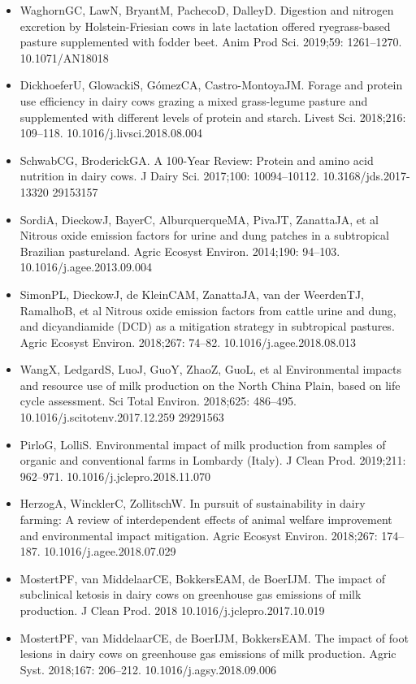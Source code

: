 \documentclass[11pt,a4paper]{article}
\begin{document}
\begin{itemize}
\item WaghornGC, LawN, BryantM, PachecoD, DalleyD. Digestion and nitrogen excretion by Holstein-Friesian cows in late lactation offered ryegrass-based pasture supplemented with fodder beet. Anim Prod Sci. 2019;59: 1261–1270. 10.1071/AN18018
\item DickhoeferU, GlowackiS, GómezCA, Castro-MontoyaJM. Forage and protein use efficiency in dairy cows grazing a mixed grass-legume pasture and supplemented with different levels of protein and starch. Livest Sci. 2018;216: 109–118. 10.1016/j.livsci.2018.08.004
\item SchwabCG, BroderickGA. A 100-Year Review: Protein and amino acid nutrition in dairy cows. J Dairy Sci. 2017;100: 10094–10112. 10.3168/jds.2017-13320 29153157
\item SordiA, DieckowJ, BayerC, AlburquerqueMA, PivaJT, ZanattaJA, et al Nitrous oxide emission factors for urine and dung patches in a subtropical Brazilian pastureland. Agric Ecosyst Environ. 2014;190: 94–103. 10.1016/j.agee.2013.09.004
\item SimonPL, DieckowJ, de KleinCAM, ZanattaJA, van der WeerdenTJ, RamalhoB, et al Nitrous oxide emission factors from cattle urine and dung, and dicyandiamide (DCD) as a mitigation strategy in subtropical pastures. Agric Ecosyst Environ. 2018;267: 74–82. 10.1016/j.agee.2018.08.013
\item WangX, LedgardS, LuoJ, GuoY, ZhaoZ, GuoL, et al Environmental impacts and resource use of milk production on the North China Plain, based on life cycle assessment. Sci Total Environ. 2018;625: 486–495. 10.1016/j.scitotenv.2017.12.259 29291563
\item PirloG, LolliS. Environmental impact of milk production from samples of organic and conventional farms in Lombardy (Italy). J Clean Prod. 2019;211: 962–971. 10.1016/j.jclepro.2018.11.070
\item HerzogA, WincklerC, ZollitschW. In pursuit of sustainability in dairy farming: A review of interdependent effects of animal welfare improvement and environmental impact mitigation. Agric Ecosyst Environ. 2018;267: 174–187. 10.1016/j.agee.2018.07.029
\item MostertPF, van MiddelaarCE, BokkersEAM, de BoerIJM. The impact of subclinical ketosis in dairy cows on greenhouse gas emissions of milk production. J Clean Prod. 2018 10.1016/j.jclepro.2017.10.019
\item MostertPF, van MiddelaarCE, de BoerIJM, BokkersEAM. The impact of foot lesions in dairy cows on greenhouse gas emissions of milk production. Agric Syst. 2018;167: 206–212. 10.1016/j.agsy.2018.09.006

\end{itemize}
\end{document}
